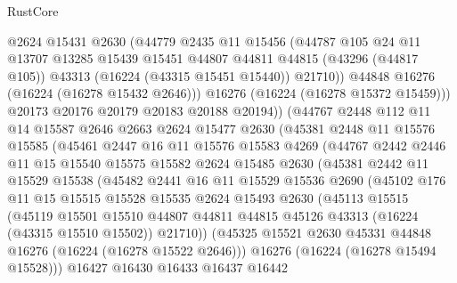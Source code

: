 \begin{lexlean}{RustCore}
\begin{coremodule}
              @2624
              @15431
              @2630
              (@44779
                @2435
                @11
                @15456
                (@44787
                  @105
                  @24
                  @11
                  @13707
                  @13285
                  @15439
                  @15451
                  @44807
                  @44811
                  @44815
                  (@43296 (@44817 @105))
                  @43313
                  (@16224 (@43315 @15451 @15440))
                  @21710))
              @44848
              @16276
              (@16224 (@16278 @15432 @2646)))
            @16276
            (@16224 (@16278 @15372 @15459)))
          @20173
          @20176
          @20179
          @20183
          @20188
          @20194))
      (@44767
        @2448
        @112
        @11
        @14
        @15587
        @2646
        @2663
        @2624
        @15477
        @2630
        (@45381
          @2448
          @11
          @15576
          @15585
          (@45461
            @2447
            @16
            @11
            @15576
            @15583
            @4269
            (@44767
              @2442
              @2446
              @11
              @15
              @15540
              @15575
              @15582
              @2624
              @15485
              @2630
              (@45381
                @2442
                @11
                @15529
                @15538
                (@45482
                  @2441
                  @16
                  @11
                  @15529
                  @15536
                  @2690
                  (@45102
                    @176
                    @11
                    @15
                    @15515
                    @15528
                    @15535
                    @2624
                    @15493
                    @2630
                    (@45113
                      @15515
                      (@45119
                        @15501
                        @15510
                        @44807
                        @44811
                        @44815
                        @45126
                        @43313
                        (@16224 (@43315 @15510 @15502))
                        @21710))
                    (@45325 @15521 @2630 @45331 @44848 @16276 (@16224 (@16278 @15522 @2646)))
                    @16276
                    (@16224 (@16278 @15494 @15528)))
                  @16427
                  @16430
                  @16433
                  @16437
                  @16442

\end{coremodule}
\end{lexlean}
